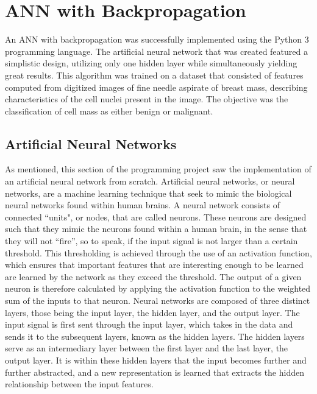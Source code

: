 \documentclass[a4paper]{article}
\begin{document}
\newpage

\section{ANN with Backpropagation}\label{ann}

An ANN with backpropagation was successfully implemented using the Python 3 programming language. The artificial neural network that was created featured a simplistic design, utilizing only one hidden layer while simultaneously yielding great results. This algorithm was trained on a dataset that consisted of features computed from digitized images of fine needle aspirate of breast mass, describing characteristics of the cell nuclei present in the image. The objective was the classification of cell mass as either benign or malignant.

\subsection{Artificial Neural Networks}
\label{ANNTheory}

As mentioned, this section of the programming project saw the implementation of an artificial neural network from scratch. Artificial neural networks, or neural networks, are a machine learning technique that seek to mimic the biological neural networks found within human brains. A neural network consists of connected ``units", or nodes, that are called neurons. These neurons are designed such that they mimic the neurons found within a human brain, in the sense that they will not ``fire'', so to speak, if the input signal is not larger than a certain threshold. This thresholding is achieved through the use of an activation function, which ensures that important features that are interesting enough to be learned are learned by the network as they exceed the threshold. The output of a given neuron is therefore calculated by applying the activation function to the weighted sum of the inputs to that neuron. Neural networks are composed of three distinct layers, those being the input layer, the hidden layer, and the output layer. The input signal is first sent through the input layer, which takes in the data and sends it to the subsequent layers, known as the hidden layers. The hidden layers serve as an intermediary layer between the first layer and the last layer, the output layer. It is within these hidden layers that the input becomes further and further abstracted, and a new representation is learned that extracts the hidden relationship between the input features. 
\end{document}

